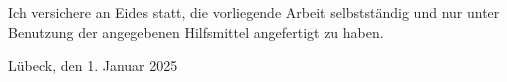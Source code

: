 \thispagestyle{empty}

\vspace*{7cm}
\noindent Ich versichere an Eides statt, die vorliegende Arbeit selbstständig und nur unter Benutzung der angegebenen Hilfsmittel angefertigt zu haben.

\vspace*{3cm}
\noindent Lübeck, den 1. Januar 2025
\newpage
